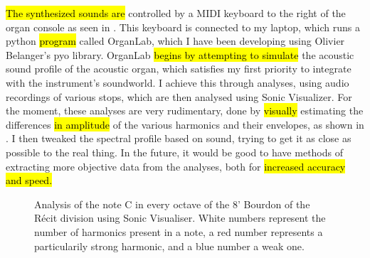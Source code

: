\documentclass[12pt,twoside,maitrise]{dms_ks}
\theoremstyle{definition}
\begin{document}
{\hl{The synthesized sounds are} controlled by a MIDI keyboard to the right of the organ console as seen in . 
This keyboard is connected to my laptop, which runs a python \hl{program} called OrganLab, which I have been developing using Olivier Belanger's pyo library. 
OrganLab \hl{begins by attempting to simulate} the acoustic sound profile of the acoustic organ, which satisfies my first priority to integrate with the instrument's soundworld. 
I achieve this through analyses, using audio recordings of various stops, which are then analysed using Sonic Visualizer. 
For the moment, these analyses are very rudimentary, done  by \hl{visually} estimating the differences \hl{in amplitude }of the various harmonics and their envelopes, as shown in . 
I then tweaked the spectral profile based on sound, trying to get it as close as possible to the real thing. 
In the future, it would be good to have methods of extracting more objective data from the analyses, both for \hl{increased accuracy and speed.}

\begin{figure}[h]
    \centering
	\caption{Analysis of the note C in every octave of the 8' Bourdon of the Récit division using Sonic Visualiser. White numbers represent the number of harmonics present in a note, a red number represents a particularily strong harmonic, and a blue number a weak one.}
    \label{fig:bourdon_analysis}
\end{figure}

}
\end{document}
